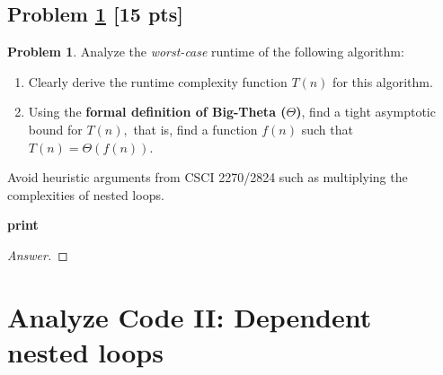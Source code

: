 \documentclass[11pt]{article}
\theoremstyle{definition}
\theoremstyle{definition}
\newtheorem{required}{Problem}
\theoremstyle{definition}
\begin{document}
\subsection{Problem \ref{Analyze1} [15 pts]} 
\begin{required} \label{Analyze1}
Analyze the \textit{worst-case} runtime of the following algorithm: 
\begin{enumerate}
    \item Clearly derive the runtime complexity function $T(n)$ for this algorithm.
    \item Using the \textbf{formal definition of Big-Theta ($\Theta$)}, find a tight asymptotic bound for $T(n),$ that is, find a function $f(n)$ such that $T(n) = \Theta(f(n))$.
\end{enumerate}

Avoid heuristic arguments from CSCI 2270/2824 such as multiplying the
complexities of nested loops.
 
\begin{algorithm}
    \caption{Nested Algorithm 1}\label{alg:Nested2}
    \begin{algorithmic}[1]
    		\State \textbf{print} 
    	\EndFor
    \EndFor
    \EndProcedure
    \end{algorithmic}
\end{algorithm}

\begin{proof}[Answer]
\end{proof}
\end{required}


\newpage
\section{Analyze Code II: Dependent nested loops}
\end{document}
